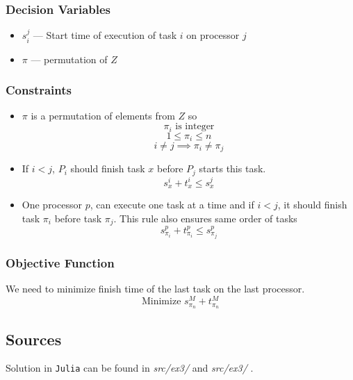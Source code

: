 \subsubsection*{Decision Variables}
\begin{itemize}
    \item $s^j_i$ --- Start time of execution of task $i$ on processor $j$
    \item $\pi$ --- permutation of $Z$
\end{itemize}
\subsubsection*{Constraints}
\begin{itemize}
    \item $\pi$ is a permutation of elements from $Z$ so 
    $$\pi_i \textrm{ is integer}$$
    $$1 \leqslant \pi_i \leqslant n $$
    $$i \neq j \implies \pi_i \neq \pi_j$$
    
    \item If $i < j$, $P_i$ should finish task $x$ before $P_j$ starts this task.
    $$s_{x}^i + t_{x}^i \leqslant s_{x}^j$$
    \item One processor $p$, can execute one task at a time and if $i < j$, it should finish task $\pi_i$ before task $\pi_j$. This rule also ensures same order of tasks
    $$s_{\pi_i}^p + t_{\pi_i}^p \leqslant s_{\pi_j}^p$$
    
\end{itemize}
\subsubsection*{Objective Function}
We need to minimize finish time of the last task on the last processor.
$$\textrm{Minimize } s_{\pi_n}^M + t_{\pi_n}^M$$
\subsection{Sources}
Solution in \texttt{Julia} can be found in \textit{src/ex3/} and \textit{src/ex3/} .

